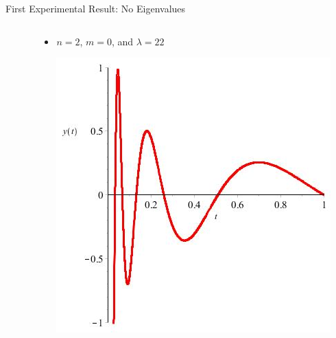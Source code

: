 \documentclass{beamer}
\begin{document}
\begin{frame}{First Experimental Result: No Eigenvalues}
\begin{columns}[T]
\begin{column}{35mm}
\begin{itemize}
\end{itemize}

\end{column}

\hspace*{-1mm}

\begin{column}{35mm}

\begin{itemize}

\item $n=2$, $m=0$, and $\lambda=22$

\includegraphics[scale=0.15]{NEquals2MEquals0LambdaEquals22}

\end{itemize}

\end{column}

\end{columns}

\end{frame}
\end{document}
